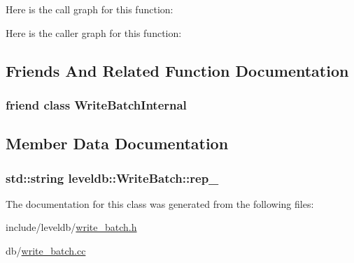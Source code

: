 Here is the call graph for this function\-:




Here is the caller graph for this function\-:




\subsection{Friends And Related Function Documentation}
\hypertarget{classleveldb_1_1_write_batch_a0c491f15816190f8235ccd1367d5ae5f}{
\subsubsection[{Write\-Batch\-Internal}]{\setlength{\rightskip}{0pt plus 5cm}friend class {\bf Write\-Batch\-Internal}\hspace{0.3cm}{\ttfamily [friend]}}}\label{classleveldb_1_1_write_batch_a0c491f15816190f8235ccd1367d5ae5f}


\subsection{Member Data Documentation}
\hypertarget{classleveldb_1_1_write_batch_acb95a84f553a7dfa89f27a0500060837}{
\subsubsection[{rep\-\_\-}]{\setlength{\rightskip}{0pt plus 5cm}std\-::string leveldb\-::\-Write\-Batch\-::rep\-\_\-\hspace{0.3cm}{\ttfamily [private]}}}\label{classleveldb_1_1_write_batch_acb95a84f553a7dfa89f27a0500060837}


The documentation for this class was generated from the following files\-:\begin{DoxyCompactItemize}
\item 
include/leveldb/\hyperlink{write__batch_8h}{write\-\_\-batch.\-h}\item 
db/\hyperlink{write__batch_8cc}{write\-\_\-batch.\-cc}\end{DoxyCompactItemize}
